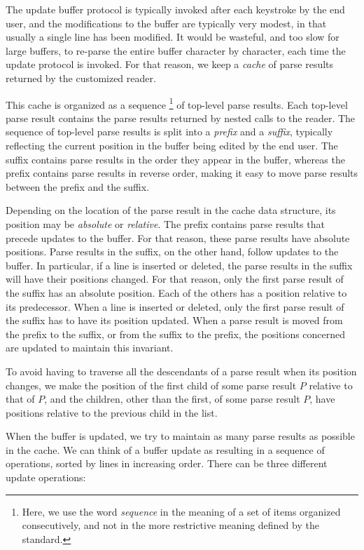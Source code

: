 The update buffer protocol is typically invoked after each keystroke
by the end user, and the modifications to the buffer are typically
very modest, in that usually a single line has been modified.  It
would be wasteful, and too slow for large buffers, to re-parse the
entire buffer character by character, each time the update protocol is
invoked.  For that reason, we keep a \emph{cache} of parse results
returned by the customized reader.

This cache is organized as a sequence%
\footnote{Here, we use the word \emph{sequence} in the meaning of a
  set of items organized consecutively, and not in the more
  restrictive meaning defined by the \commonlisp{} standard.}  of
top-level parse results.  Each top-level parse result contains the
parse results returned by nested calls to the reader.  The sequence of
top-level parse results is split into a \emph{prefix} and a
\emph{suffix}, typically reflecting the current position in the buffer
being edited by the end user.  The suffix contains parse results in
the order they appear in the buffer, whereas the prefix contains parse
results in reverse order, making it easy to move parse results between
the prefix and the suffix.

Depending on the location of the parse result in the cache data
structure, its position may be \emph{absolute} or \emph{relative}.
The prefix contains parse results that precede updates to the buffer.
For that reason, these parse results have absolute positions.  Parse
results in the suffix, on the other hand, follow updates to the
buffer.  In particular, if a line is inserted or deleted, the parse
results in the suffix will have their positions changed.  For that
reason, only the first parse result of the suffix has an absolute
position.  Each of the others has a position relative to its
predecessor.  When a line is inserted or deleted, only the first parse
result of the suffix has to have its position updated.  When a parse
result is moved from the prefix to the suffix, or from the suffix to
the prefix, the positions concerned are updated to maintain this
invariant.

To avoid having to traverse all the descendants of a parse result when
its position changes, we make the position of the first child of some
parse result $P$ relative to that of $P$, and the children, other than
the first, of some parse result $P$, have positions relative to the
previous child in the list.

When the buffer is updated, we try to maintain as many parse results
as possible in the cache.  We can think of a buffer update as
resulting in a sequence of operations, sorted by lines in increasing
order.  There can be three different update operations:

